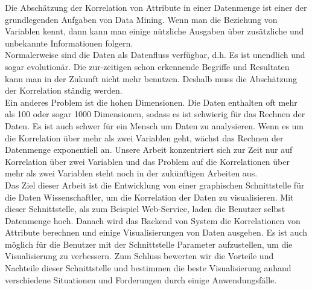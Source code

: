 
\Abstract
Die Abschätzung der Korrelation von Attribute in einer Datenmenge ist einer der grundlegenden Aufgaben von Data Mining. Wenn man die Beziehung von Variablen kennt, dann kann man einige nützliche Ausgaben über zusätzliche und unbekannte Informationen folgern.\\
Normalerweise sind die Daten als Datenfluss verfügbar, d.h. Es ist unendlich und sogar evolutionär. Die zur-zeitigen schon erkennende Begriffe und Resultaten kann man in der Zukunft nicht mehr benutzen. Deshalb muss die Abschätzung der Korrelation ständig werden.\\
Ein anderes Problem ist die hohen Dimensionen. Die Daten enthalten oft mehr als 100 oder sogar 1000 Dimensionen, sodass es ist schwierig für das Rechnen der Daten. Es ist auch schwer für ein Mensch um Daten zu analysieren. Wenn es um die Korrelation über mehr als zwei Variablen geht, wächst das Rechnen der Datenmenge exponentiell an. Unsere Arbeit konzentriert sich zur Zeit nur auf Korrelation über zwei Variablen und das Problem auf die Korrelationen über mehr als zwei Variablen steht noch in der zukünftigen Arbeiten aus.\\
Das Ziel dieser Arbeit ist die Entwicklung von einer graphischen Schnittstelle für die Daten Wissenschaftler, um die Korrelation der Daten zu visualisieren. Mit dieser Schnittstelle, als zum Beispiel Web-Service, laden die Benutzer selbst Datenmenge hoch. Danach wird das Backend von System die Korrelationen von Attribute berechnen und einige Visualisierungen von Daten ausgeben. Es ist auch möglich für die Benutzer mit der Schnittstelle Parameter aufzustellen, um die Visualisierung zu verbessern. Zum Schluss bewerten wir die Vorteile und Nachteile dieser Schnittstelle und bestimmen die beste Visualisierung anhand verschiedene Situationen und Forderungen durch einige Anwendungsfälle.\\

